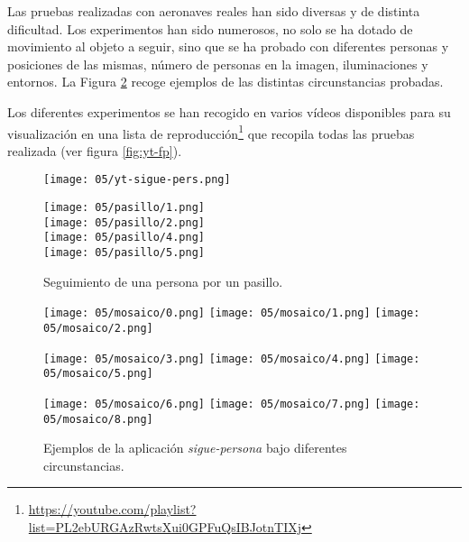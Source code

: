 \documentclass[../main.tex]{subfiles}
\begin{document}
Las pruebas realizadas con aeronaves reales han sido diversas y de distinta dificultad. Los experimentos han sido numerosos, no solo se ha dotado de movimiento al objeto a seguir, sino que se ha probado con diferentes personas y posiciones de las mismas, número de personas en la imagen, iluminaciones y entornos. La Figura \ref{fig:mosaico} recoge ejemplos de las distintas circunstancias probadas.

Los diferentes experimentos se han recogido en varios vídeos disponibles para su visualización en una lista de reproducción\footnote{\url{https://youtube.com/playlist?list=PL2ebURGAzRwtsXui0GPFuQsIBJotnTIXj}} que recopila todas las pruebas realizada (ver figura \ref{fig:yt-fp}).

\begin{figure}[!ht]
 	{\texttt{[image: 05/yt-sigue-pers.png]}}
\end{figure}

\begin{figure}[htp]
    \caption{Seguimiento de una persona por un pasillo.} \label{fig:pasillo}
 	\texttt{[image: 05/pasillo/1.png]} \\
    \texttt{[image: 05/pasillo/2.png]} \\
    \texttt{[image: 05/pasillo/4.png]} \\
    \texttt{[image: 05/pasillo/5.png]}
\end{figure}

\begin{figure}[htp]
    \caption{Ejemplos de la aplicación \emph{sigue-persona} bajo diferentes circunstancias.} \label{fig:mosaico}
 	\texttt{[image: 05/mosaico/0.png]}\hfill
    \texttt{[image: 05/mosaico/1.png]}\hfill
    \texttt{[image: 05/mosaico/2.png]}
    
    \texttt{[image: 05/mosaico/3.png]}\hfill
    \texttt{[image: 05/mosaico/4.png]}\hfill
    \texttt{[image: 05/mosaico/5.png]}
    
    \texttt{[image: 05/mosaico/6.png]}\hfill
    \texttt{[image: 05/mosaico/7.png]}\hfill
    \texttt{[image: 05/mosaico/8.png]}
\end{figure}
\end{document}
